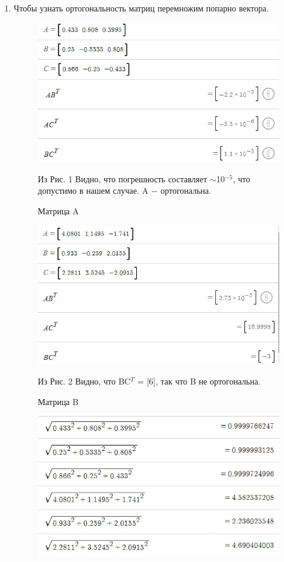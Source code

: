 \begin{enumerate}
    \item 
        Чтобы узнать ортогональность матриц перемножим попарно вектора.\\
        \begin{figure}
            \includegraphics[width=0.6\linewidth]{2_A_orto.png}
            \caption{Матрица A} 
            Из Рис. 1 Видно, что погрешность составляет $\sim$10$^{-5}$, что допустимо в нашем случае. A $-$ ортогональна.\\
        \end{figure}
        \begin{figure}
            \includegraphics[width=0.6\linewidth]{2_B_orto.png}
            \caption{Матрица B}
            Из Рис. 2 Видно, что BC$^T$ = [6], так что B не ортогональна.\\
        \end{figure}
        \begin{figure}
            \includegraphics[width=0.75\linewidth]{2_AB_norm.png}

\end{figure}
\end{enumerate}
